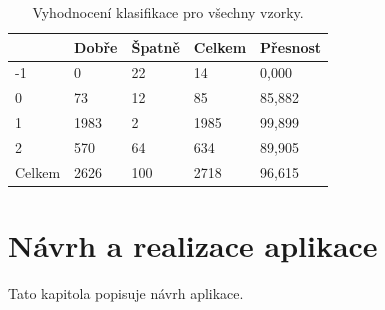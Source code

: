 \documentclass[11pt,twoside,a4paper,table]{book}
\begin{document}
\begin{table}[h]
\begin{center}
\begin{tabular}{lllll}
\rowcolor[HTML]{9B9B9B} 
\multicolumn{1}{|l|}{\cellcolor[HTML]{9B9B9B}Třída} & \multicolumn{1}{l|}{\cellcolor[HTML]{9B9B9B}Dobře} & \multicolumn{1}{l|}{\cellcolor[HTML]{9B9B9B}Špatně}  & \multicolumn{1}{l|}{\cellcolor[HTML]{9B9B9B}Celkem} & \multicolumn{1}{l|}{\cellcolor[HTML]{9B9B9B}Přesnost} \\ \hline
\multicolumn{1}{|l|}{-1}                            & \multicolumn{1}{l|}{0}                             & \multicolumn{1}{l|}{22}                              & \multicolumn{1}{l|}{14}                             & \multicolumn{1}{l|}{0,000}                            \\ \hline
\multicolumn{1}{|l|}{0}                             & \multicolumn{1}{l|}{73}                            & \multicolumn{1}{l|}{12}                              & \multicolumn{1}{l|}{85}                             & \multicolumn{1}{l|}{85,882}                           \\ \hline
\multicolumn{1}{|l|}{1}                             & \multicolumn{1}{l|}{1983}                          & \multicolumn{1}{l|}{2}                               & \multicolumn{1}{l|}{1985}                           & \multicolumn{1}{l|}{99,899}                           \\ \hline
\multicolumn{1}{|l|}{2}                             & \multicolumn{1}{l|}{570}                           & \multicolumn{1}{l|}{64}                              & \multicolumn{1}{l|}{634}                            & \multicolumn{1}{l|}{89,905}                           \\ \hline
Celkem                                              & 2626                                               & 100                                                  & 2718                                                & 96,615                                                \\ \hline
\end{tabular}
\end{center}
\caption{Vyhodnocení klasifikace pro všechny vzorky. }
\label{tab:classresult8}
\end{table}

\chapter{Návrh a realizace aplikace}
Tato kapitola popisuje návrh aplikace.
\end{document}
